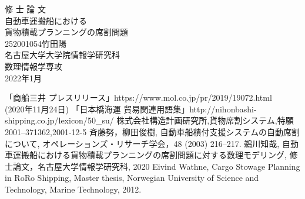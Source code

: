 \documentclass[uplatex]{ujreport}
\begin{document}
\begin{table}[b]
\begin{center}
{\huge 修\hspace{0.1cm} 士\hspace{0.1cm} 論\hspace{0.1cm} 文}\\[2.5cm]
{\huge 自動車運搬船における \\ 貨物積載プランニングの席割問題}\\[6cm]
{\huge 252001054\qquad 竹田陽}\\[1cm]
{\huge 名古屋大学大学院情報学研究科}\\[0.5cm]
{\huge 数理情報学専攻}\\[0.5cm]
{\huge 2022年1月}\\
\end{center}
\end{table}


\thispagestyle{empty}
\clearpage
\newpage
{}
\setcounter{page}{1}







\thispagestyle{empty}
\tableofcontents
\newpage
\setcounter{page}{1}
\pagestyle{plain}















\begin{thebibliography}{99}
 「商船三井 プレスリリース」https://www.mol.co.jp/pr/2019/19072.html \\ (2020年11月24日)
 「日本橋海運 貿易関連用語集」http://nihonbashi-shipping.co.jp/lexicon/50\_su/
  株式会社構造計画研究所,貨物席割システム,特願2001--371362,2001-12-5
 斉藤努，柳田俊樹, 自動車船積付支援システムの自動席割について, オペレーションズ・リサーチ学会，48 (2003) 216--217.
 鵜川知哉, 自動車運搬船における貨物積載プランニングの席割問題に対する数理モデリング, 修士論文，名古屋大学情報学研究科, 2020
Eivind Wathne, Cargo Stowage Planning in RoRo Shipping, Master thesis, Norwegian University of Science and Technology, Marine Technology, 2012.
\end{thebibliography}
\end{document}
